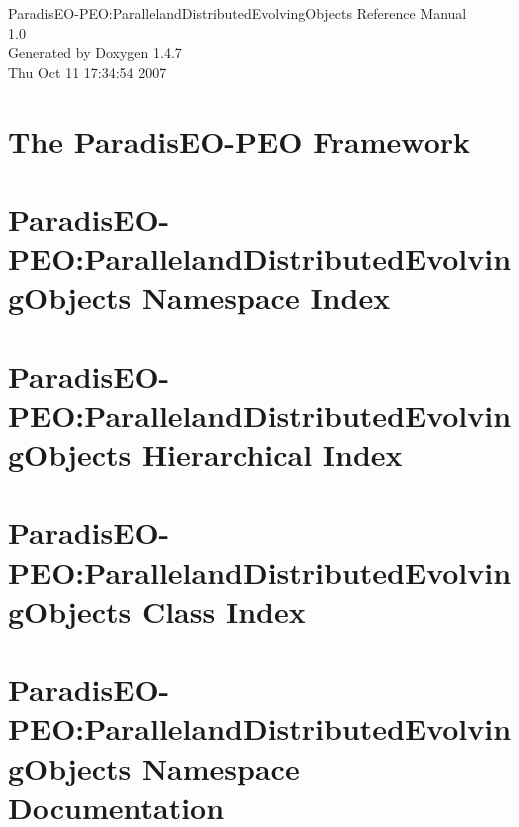 \documentclass[a4paper]{book}
\begin{document}
\begin{titlepage}
\vspace*{7cm}
\begin{center}
{\Large Paradis\-EO-PEO:Paralleland\-Distributed\-Evolving\-Objects Reference Manual\\[1ex]\large 1.0 }\\
\vspace*{1cm}
{\large Generated by Doxygen 1.4.7}\\
\vspace*{0.5cm}
{\small Thu Oct 11 17:34:54 2007}\\
\end{center}
\end{titlepage}
\clearemptydoublepage
{}
\tableofcontents
\clearemptydoublepage
{}
\chapter{The Paradis\-EO-PEO Framework }
\label{index}\hypertarget{index}{}
\chapter{Paradis\-EO-PEO:Paralleland\-Distributed\-Evolving\-Objects Namespace Index}

\chapter{Paradis\-EO-PEO:Paralleland\-Distributed\-Evolving\-Objects Hierarchical Index}

\chapter{Paradis\-EO-PEO:Paralleland\-Distributed\-Evolving\-Objects Class Index}

\chapter{Paradis\-EO-PEO:Paralleland\-Distributed\-Evolving\-Objects Namespace Documentation}

\end{document}
